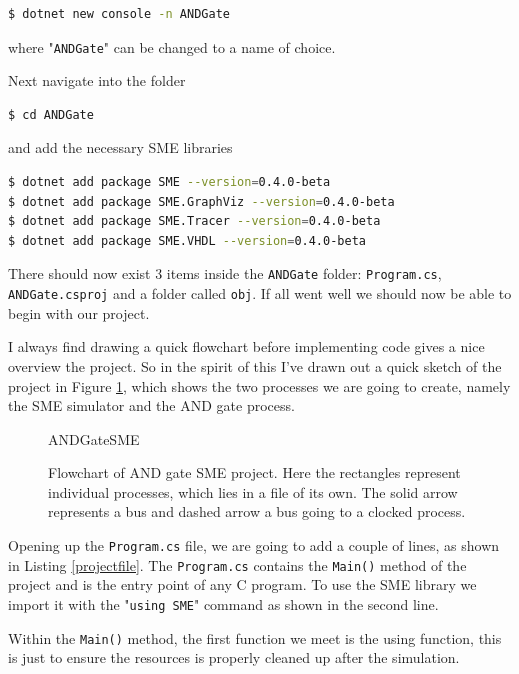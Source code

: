         \begin{lstlisting}[language=bash]
$ dotnet new console -n ANDGate
        \end{lstlisting}
        where "\texttt{ANDGate}" can be changed to a name of choice.
        
        Next navigate into the folder
        \begin{lstlisting}[language=bash]
$ cd ANDGate 
        \end{lstlisting}
        and add the necessary SME libraries
        \begin{lstlisting}[language=bash]
$ dotnet add package SME --version=0.4.0-beta
$ dotnet add package SME.GraphViz --version=0.4.0-beta
$ dotnet add package SME.Tracer --version=0.4.0-beta
$ dotnet add package SME.VHDL --version=0.4.0-beta
        \end{lstlisting}
        
        There should now exist 3 items inside the \texttt{ANDGate} folder: \texttt{Program.cs}, \texttt{ANDGate.csproj} and a folder called \texttt{obj}. If all went well we should now be able to begin with our project.
        
        I always find drawing a quick flowchart before implementing code gives a nice overview the project. So in the spirit of this I've drawn out a quick sketch of the project in Figure \ref{fig:ANDGateSME}, which shows the two processes we are going to create, namely the SME simulator and the AND gate process.
        
        \begin{figure}[h!]
            \vspace*{-1.5cm}
            \centering
            {ANDGateSME}
            \caption{Flowchart of AND gate SME project. Here the rectangles represent individual processes, which lies in a file of its own. The solid arrow represents a bus and dashed arrow a bus going to a clocked process.}
            \label{fig:ANDGateSME}
        \end{figure}  
        
        
\newpage
        Opening up the \texttt{Program.cs} file, we are going to add a couple of lines, as shown in Listing \ref{projectfile}. The \texttt{Program.cs} contains the \texttt{Main()} method of the project and is the entry point of any C program. To use the SME library we import it with the "\texttt{using SME}" command as shown in the second line. 
        
        Within the \texttt{Main()} method, the first function we meet is the using function, this is just to ensure the resources is properly cleaned up after the simulation.
        
